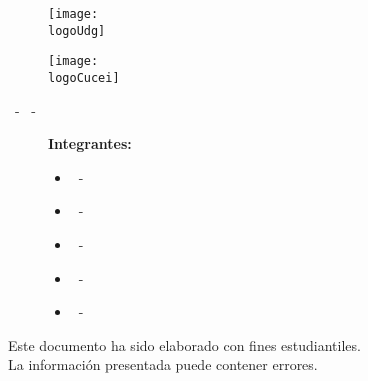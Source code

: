 



\begin{titlepage}
	\centering
	{\huge\textbf{\universidad}}\par
	\vspace{0.6cm}
	{\LARGE{\cede}}
	\vfill

	\begin{figure}[h]
		\begin{minipage}[t]{0.45\textwidth}
			\centering
			\texttt{[image: \\logoUdg]}
		\end{minipage}
		\hfill
		\begin{minipage}[t]{0.45\textwidth}
			\centering
			\texttt{[image: \\logoCucei]}
		\end{minipage}
	\end{figure}
	\vfill

	\Large{
		\division\vfill
		\textbf{\carrera}\vfill
		\textbf{\materia}
		\par\vspace{3pt}
		\seccion\ - \clave\ - \nrc\vfill
	}

	{\LARGE{\textbf{\theTitle}}}
	\vfill

	\begin{figure}[h]
		\centering
		\begin{minipage}[t]{0.75\textwidth}
			{\Large
				\textbf{Integrantes:}\par\vspace{8pt}
				\begin{itemize}
					\item \bAuthor\ - \bAuthorCode
					\item \cAuthor\ - \cAuthorCode
					\item \dAuthor\ - \dAuthorCode
					\item \eAuthor\ - \eAuthorCode
					\item \theAuthor\ - \theAuthorCode
				\end{itemize}
			}
		\end{minipage}
	\end{figure}\vfill

	\begin{tcolorbox}
		[colback=red!5!white, colframe=red!75!black]
		\centering
		Este documento ha sido elaborado con fines estudiantiles.\\
		La información presentada puede contener errores.
	\end{tcolorbox}
	\vfill
	{\large \startDate}\par
\end{titlepage}

